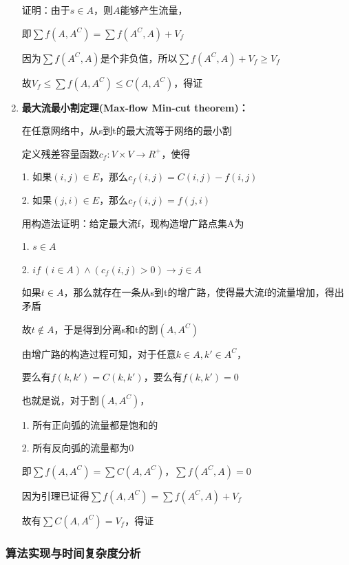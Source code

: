 \documentclass[UTF8]{ctexart}
\begin{document}
\begin{enumerate}
            证明：由于$s\in A$，则$A$能够产生流量，

            即$\sum f(A,A^C)=\sum f(A^C,A)+V_f$

            因为$\sum f(A^C,A)$是个非负值，所以$\sum f(A^C,A)+V_f\ge V_f$

            故$V_f\le\sum f(A,A^C)\le C(A,A^C)$，得证

      \item
            \textbf{最大流最小割定理(Max-flow Min-cut theorem)：}\cite{enwiki:1192320700}

            在任意网络中，从s到t的最大流等于网络的最小割

            定义残差容量函数$c_f:V\times V\to R^+$，使得

            1. 如果$(i,j)\in E$，那么$c_f(i,j)=C(i,j)-f(i,j)$

            2. 如果$(j,i)\in E$，那么$c_f(i,j)=f(j,i)$

            用构造法证明：给定最大流f，现构造增广路点集A为

            1. $s\in A$

            2. $if\ (i \in A) \land (c_f(i,j) > 0) \to j\in A$

            如果$t\in A$，那么就存在一条从s到t的增广路，使得最大流f的流量增加，得出矛盾

            故$t\notin A$，于是得到分离s和t的割$(A,A^C)$

            由增广路的构造过程可知，对于任意$k\in A,k'\in A^C$，

            要么有$f(k,k')=C(k,k')$，要么有$f(k,k')=0$

            也就是说，对于割$(A,A^C)$，

            1. 所有正向弧的流量都是饱和的

            2. 所有反向弧的流量都为0

            即$\sum f(A,A^C)=\sum C(A,A^C)$，$\sum f(A^C,A)=0$

            因为引理已证得$\sum f(A,A^C)=\sum f(A^C,A)+V_f$

            故有$\sum C(A,A^C)=V_f$，得证
\end{enumerate}

\vspace{10cm}

\subsubsection{算法实现与时间复杂度分析}
\end{document}
